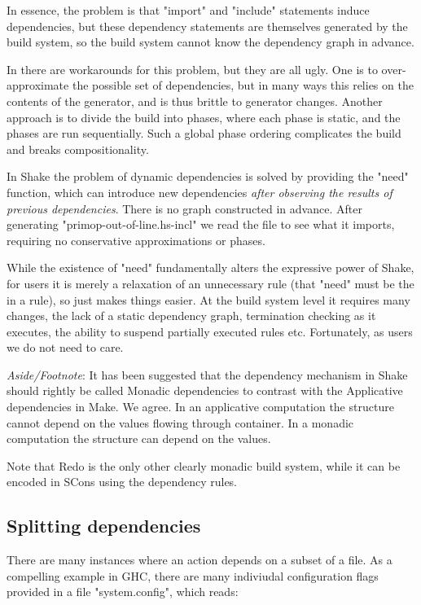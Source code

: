 In essence, the problem is that \lst"import" and \lst"include" statements induce dependencies, but these dependency statements are themselves generated by the build system, so the build system cannot know the dependency graph in advance.

In \make{} there are workarounds for this problem, but they are all ugly. One is to over-approximate the possible set of dependencies, but in many ways this relies on the contents of the generator, and is thus brittle to generator changes. Another approach is to divide the build into phases, where each phase is static, and the phases are run sequentially. Such a global phase ordering complicates the build and breaks compositionality.


In Shake the problem of dynamic dependencies is solved by providing the \lst"need" function, which can introduce new dependencies \emph{after observing the results of previous dependencies}. There is no graph constructed in advance.  After generating \lst"primop-out-of-line.hs-incl" we read the file to see what it imports, requiring no conservative approximations or phases.

While the existence of \lst"need" fundamentally alters the expressive power of Shake, for users it is merely a relaxation of an unnecessary rule (that \lst"need" must be the in a rule), so just makes things easier. At the build system level it requires many changes, the lack of a static dependency graph, termination checking as it executes, the ability to suspend partially executed rules etc. Fortunately, as users we do not need to care.

\textit{Aside/Footnote}: It has been suggested that the dependency mechanism in Shake should rightly be called Monadic dependencies to contrast with the Applicative dependencies in Make. We agree. In an applicative computation the structure cannot depend on the values flowing through container. In a monadic computation the structure can depend on the values.

Note that Redo is the only other clearly monadic build system, while it can be encoded in SCons using the dependency rules.

\subsection{Splitting dependencies}

There are many instances where an action depends on a subset of a file. As a compelling example in GHC, there are many indiviudal configuration flags provided in a file \lst"system.config", which reads:

